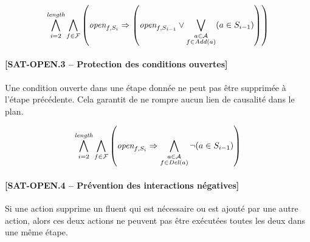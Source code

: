 \begin{small}
\[
\bigwedge\limits_{\substack{i=2}}^{\textit{length}}\bigwedge\limits_{\substack{\substack{f\in \mathcal{F}}}}\left(\textit{open}_{f,S_{i}} \Rightarrow \left(\textit{open}_{f,S_{i-1}} \vee \bigvee\limits_{\substack{\substack{a\in \mathcal{A}\\f \in \mathit{Add}(a)}}}(a \in S_{i - 1})\right)\right)
\]
\end{small}



\paragraph*{[SAT-OPEN.3 -- Protection des conditions ouvertes]}

Une condition ouverte dans une étape donnée ne peut pas être supprimée à l'étape précédente. Cela garantit de ne rompre aucun lien de causalité dans le plan.


\begin{small}
\[
\bigwedge\limits_{\substack{i=2}}^{\textit{length}}\bigwedge\limits_{\substack{\substack{f\in \mathcal{F}}}}\left(\textit{open}_{f,S_{i}} \Rightarrow \bigwedge\limits_{\substack{\substack{a\in \mathcal{A}\\f \in \mathit{Del}(a)}}}\neg (a \in S_{i - 1})\right)
\]
\end{small}

\paragraph*{[SAT-OPEN.4 -- Prévention des interactions négatives]}

Si une action supprime un fluent qui est nécessaire ou est ajouté par une autre action, alors ces deux actions ne peuvent pas être exécutées toutes les deux dans une même étape.


